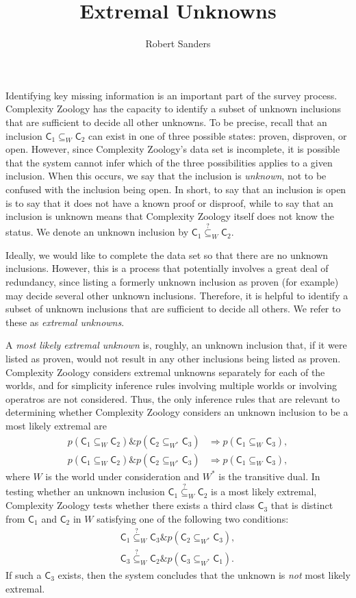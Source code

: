 \documentclass[12pt]{amsart}
\title{Extremal Unknowns}
\date{}
\author{Robert Sanders}
\theoremstyle{definition}
\theoremstyle{remark}
\newcommand{\sC}{\mathsf{C}}
\newcommand{\AND}{\mathbin{\&}}
\newcommand{\subsetequ}{\stackrel{?}{\subseteq}}
\begin{document}
\maketitle

Identifying key missing information is an important part of the survey process.
Complexity Zoology has the capacity to identify a subset of unknown inclusions
that are sufficient to decide all other unknowns. To be precise, recall that
an inclusion $\sC_1\subseteq_W\sC_2$ can exist in one of three possible states:
proven, disproven, or open. However, since Complexity Zoology's data set is
incomplete, it is possible that the system cannot infer which of the three
possibilities applies to a given inclusion. When this occurs, we say that the
inclusion is \textit{unknown}, not to be confused with the inclusion being
open. In short, to say that an inclusion is open is to say that it does not
have a known proof or disproof, while to say that an inclusion is unknown
means that Complexity Zoology itself does not know the status. We denote an
unknown inclusion by $\sC_1\subsetequ_W\sC_2$.

Ideally, we would like to complete the data set so that there are no unknown
inclusions. However, this is a process that potentially involves a great deal
of redundancy, since listing a formerly unknown inclusion as proven (for
example) may decide several other unknown inclusions. Therefore, it is helpful
to identify a subset of unknown inclusions that are sufficient to decide all
others. We refer to these as \textit{extremal unknowns}.

A \textit{most likely extremal unknown} is, roughly, an unknown inclusion that,
if it were listed as proven, would not result in any other inclusions being
listed as proven. Complexity Zoology considers extremal unknowns separately for
each of the worlds, and for simplicity inference rules involving multiple
worlds or involving operatros are not considered. Thus, the only inference
rules that are relevant to determining whether Complexity Zoology considers an
unknown inclusion to be a most likely extremal are
\begin{align*}
p(\sC_1\subseteq_W\sC_2)\AND p(\sC_2\subseteq_{W^*}\sC_3)&\Longrightarrow
p(\sC_1\subseteq_W\sC_3), \\
p(\sC_1\subseteq_W\sC_2)\AND p(\sC_2\subseteq_{W^*}\sC_3)&\Longrightarrow
p(\sC_1\subseteq_W\sC_3),
\end{align*}
where $W$ is the world under consideration and $W^*$ is the transitive dual. In
testing whether an unknown inclusion $\sC_1\subsetequ_W\sC_2$ is a most likely
extremal, Complexity Zoology tests whether there exists a third class $\sC_3$
that is distinct from $\sC_1$ and $\sC_2$ in $W$ satisfying one of the
following two conditions:
\begin{align*}
\sC_1\subsetequ_W\sC_3\AND p(\sC_2\subseteq_{W^*}\sC_3), \\
\sC_3\subsetequ_W\sC_2\AND p(\sC_3\subseteq_{W^*}\sC_1).
\end{align*}
If such a $\sC_3$ exists, then the system concludes that the unknown is
\textit{not} most likely extremal.
\end{document}
